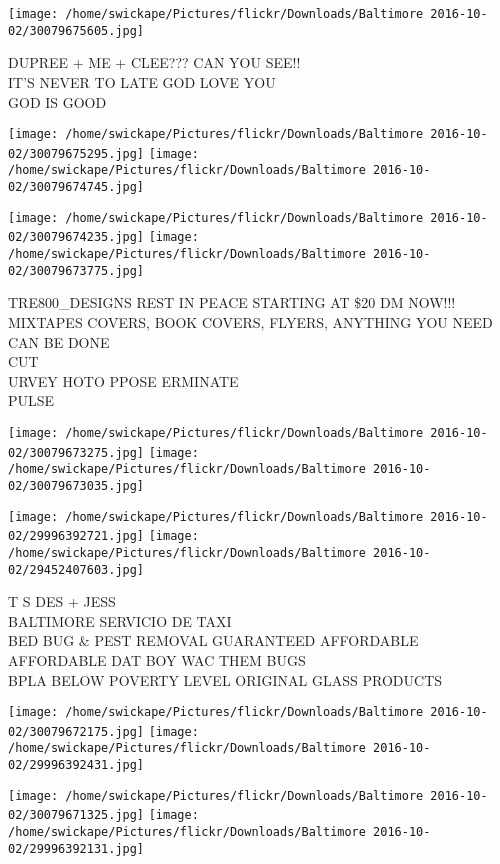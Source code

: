 \documentclass[10pt,letterpaper]{article}
\begin{document}
\vspace{0.25in}
\texttt{[image: /home/swickape/Pictures/flickr/Downloads/Baltimore 2016-10-02/30079675605.jpg]}

DUPREE + ME + CLEE??? CAN YOU SEE!!\\
IT'S NEVER TO LATE GOD LOVE YOU\\
GOD IS GOOD
\pagebreak

\texttt{[image: /home/swickape/Pictures/flickr/Downloads/Baltimore 2016-10-02/30079675295.jpg]}
\texttt{[image: /home/swickape/Pictures/flickr/Downloads/Baltimore 2016-10-02/30079674745.jpg]}

\texttt{[image: /home/swickape/Pictures/flickr/Downloads/Baltimore 2016-10-02/30079674235.jpg]}
\texttt{[image: /home/swickape/Pictures/flickr/Downloads/Baltimore 2016-10-02/30079673775.jpg]}

TRE800\_DESIGNS REST IN PEACE STARTING AT \$20 DM NOW!!! MIXTAPES COVERS, BOOK COVERS, FLYERS, ANYTHING YOU NEED CAN BE DONE\\
CUT\\
URVEY HOTO PPOSE ERMINATE\\
PULSE
\pagebreak

\texttt{[image: /home/swickape/Pictures/flickr/Downloads/Baltimore 2016-10-02/30079673275.jpg]}
\texttt{[image: /home/swickape/Pictures/flickr/Downloads/Baltimore 2016-10-02/30079673035.jpg]}

\texttt{[image: /home/swickape/Pictures/flickr/Downloads/Baltimore 2016-10-02/29996392721.jpg]}
\texttt{[image: /home/swickape/Pictures/flickr/Downloads/Baltimore 2016-10-02/29452407603.jpg]}

T S DES + JESS\\
BALTIMORE SERVICIO DE TAXI\\
BED BUG \& PEST REMOVAL GUARANTEED AFFORDABLE AFFORDABLE DAT BOY WAC THEM BUGS\\
BPLA BELOW POVERTY LEVEL ORIGINAL GLASS PRODUCTS
\pagebreak

\texttt{[image: /home/swickape/Pictures/flickr/Downloads/Baltimore 2016-10-02/30079672175.jpg]}
\texttt{[image: /home/swickape/Pictures/flickr/Downloads/Baltimore 2016-10-02/29996392431.jpg]}

\texttt{[image: /home/swickape/Pictures/flickr/Downloads/Baltimore 2016-10-02/30079671325.jpg]}
\texttt{[image: /home/swickape/Pictures/flickr/Downloads/Baltimore 2016-10-02/29996392131.jpg]}
\end{document}
